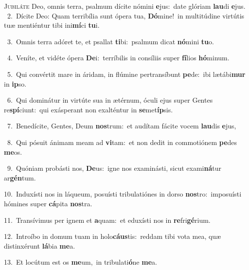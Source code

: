 \lettrine{\initial\textcolor{\initialcolor}{J}}{ubiláte} Deo, omnis terra, psalmum dícite nómini \textbf{e}\-jus:~\star date glóriam \textbf{lau}\-di \textbf{e}\-jus.\\
{\numbfont\textcolor{\numbcolor}{~2.}}~Dícite Deo: Quam terribília sunt ópera tua, \textbf{Dó}\-mine!~\star in multitúdine virtútis tuæ mentiéntur tibi ini\-\textbf{mí}\-ci \textbf{tu}\-i.\par
{\numbfont\textcolor{\numbcolor}{~3.}}~Omnis terra adóret te, et psallat \textbf{ti}\-bi:~\star psalmum dicat \textbf{nó}\-mini \textbf{tu}\-o.\par
{\numbfont\textcolor{\numbcolor}{~4.}}~Veníte, et vidéte ópera \textbf{De}\-i:~\star terríbilis in consíliis super \textbf{fí}\-lios \textbf{hó}\-minum.\par
{\numbfont\textcolor{\numbcolor}{~5.}}~Qui convértit mare in áridam, in flúmine pertransíbunt \textbf{pe}\-de:~\star ibi lætábi\textbf{mur} in \textbf{ip}\-so.\par
{\numbfont\textcolor{\numbcolor}{~6.}}~Qui dominátur in virtúte sua in ætérnum, óculi ejus super Gentes re\-\textbf{spí}\-ciunt:~\star qui exásperant non exalténtur in \textbf{se}\-met\-\textbf{íp}\-sis.\par
{\numbfont\textcolor{\numbcolor}{~7.}}~Benedícite, Gentes, Deum \textbf{nos}\-trum:~\star et audítam fácite vocem \textbf{lau}\-dis \textbf{e}\-jus,\par
{\numbfont\textcolor{\numbcolor}{~8.}}~Qui pósuit ánimam meam ad \textbf{vi}\-tam:~\star et non dedit in commotiónem \textbf{pe}\-des \textbf{me}\-os.\par
{\numbfont\textcolor{\numbcolor}{~9.}}~Quóniam probásti nos, \textbf{De}\-us:~\star igne nos examinásti, sicut exami\-\textbf{ná}\-tur ar\-\textbf{gén}\-tum.\par
{\numbfont\textcolor{\numbcolor}{10.}}~Induxísti nos in láqueum, posuísti tribulatiónes in dorso \textbf{nos}\-tro:~\star imposuísti hómines super \textbf{cá}\-pita \textbf{nos}\-tra.\par
{\numbfont\textcolor{\numbcolor}{11.}}~Transívimus per ignem et \textbf{a}\-quam:~\star et eduxísti nos in \textbf{re}\-fri\-\textbf{gé}\-rium.\par
{\numbfont\textcolor{\numbcolor}{12.}}~Introíbo in domum tuam in holo\-\textbf{cáus}\-tis:~\star reddam tibi vota mea, quæ distinxérunt \textbf{lá}\-bia \textbf{me}\-a.\par
{\numbfont\textcolor{\numbcolor}{13.}}~Et locútum est os \textbf{me}\-um,~\star in tribulati\-\textbf{ó}\-ne \textbf{me}\-a.\par
